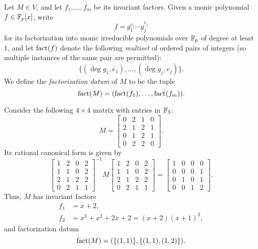 \begin{defn}
Let $M\in V$, and let $f_1,\ldots,f_m$ be its invariant factors. Given a monic polynomial $f\in\mathbb{F}_p[x]$, write
\begin{equation*}
f=g_1^{e_1}\cdots g_j^{e_j}
\end{equation*}
for its factorization into monic irreducible polynomials over $\mathbb{F}_p$ of degree at least $1$, and let $\operatorname{fact}(f)$ denote the following \emph{multiset} of ordered pairs of integers (so multiple instances of the same pair are permitted):
\begin{equation*}
\{(\deg g_1,e_1),\ldots,(\deg g_j,e_j)\}.
\end{equation*}
We define the \emph{factorization datum} of $M$ to be the tuple
\begin{equation*}
\operatorname{fact}(M)=(\operatorname{fact}(f_1),\ldots,\operatorname{fact}(f_m)).
\end{equation*}
\end{defn}
\begin{example}
\label{ex:fact}
Consider the following $4\times 4$ matrix with entries in $\mathbb{F}_3$:
\begin{equation*}
M=\begin{bmatrix}
0&2&1&0\\
2&1&2&1\\
0&1&2&1\\
0&2&2&0
\end{bmatrix}.
\end{equation*}
Its rational canonical form is given by
\begin{equation*}
\begin{bmatrix}
1&2&0&2\\
1&1&0&2\\
2&1&2&2\\
0&2&1&1
\end{bmatrix}^{-1}
M
\begin{bmatrix}
1&2&0&2\\
1&1&0&2\\
2&1&2&2\\
0&2&1&1
\end{bmatrix}
=
\begin{bmatrix}
1&0&0&0\\
0&0&0&1\\
0&1&0&1\\
0&0&1&2
\end{bmatrix}.
\end{equation*}
Thus, $M$ has invariant factors
\begin{align*}
f_1&=x+2,\\
f_2&=x^3+x^2+2x+2=(x+2)(x+1)^2,
\end{align*}
and factorization datum
\begin{equation}
\label{eqn:factM}
\operatorname{fact}(M)=(\{(1,1)\},\{(1,1),(1,2)\}).
\end{equation}
\end{example}
